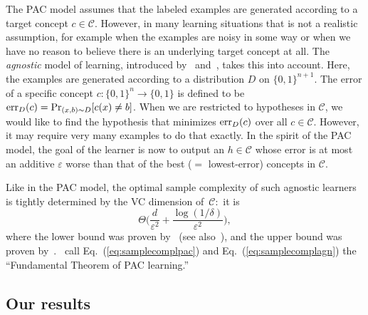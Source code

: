 \documentclass[twoside,11pt]{article}
\newcommand{\eps}{\varepsilon}
\newcommand{\err}{\mbox{\rm err}}
\def\01{\{0,1\}}
\newcommand{\C}{\ensuremath{\mathscr{C}}}
\begin{document}
The PAC model assumes that the labeled examples are generated according to a target concept $c\in\C$.
However, in many learning situations that is not a realistic assumption, for example when the examples are noisy in some way or when we have no reason to believe there is an underlying target concept at all. The \emph{agnostic} model of learning, introduced by~\cite{haussler:agnosticlearning} and~\cite{kearns:agnosticlearning}, takes this into account.
Here, the examples are generated according to a distribution $D$ on $\01^{n+1}$. The error of a specific concept $c:\01^n\to\01$ is defined to be
$\err_D(c)=\Pr_{(x,b)\sim D}[c(x)\neq b]$.
When we are restricted to hypotheses in $\C$, we would like to find the hypothesis that minimizes $\err_D(c)$ over all $c\in\C$. However, it may require very many examples to do that exactly. In the spirit of the PAC model, the goal of the learner is now to output an $h\in\C$ whose error is at most an additive $\eps$ worse than that of the best ($=$ lowest-error) concepts in $\C$.  

Like in the PAC model, the optimal sample complexity of such agnostic learners is tightly determined by the VC dimension of~$\C$:~it is
\begin{equation}\label{eq:samplecomplagn}
\Theta\Big(\frac{d}{\eps^2} + \frac{\log(1/\delta)}{\eps^2}\Big),
\end{equation}
where the lower bound was proven by~\cite{vapnik:agnosticlowerbound} (see also~\cite{simon:agnosticlowerbound}), and the upper bound was proven by~\cite{talagrand:agnosticupperbound}.~\cite{shwartz&david:learningbook} 
call Eq.~(\ref{eq:samplecomplpac}) and Eq.~(\ref{eq:samplecomplagn})
the ``Fundamental Theorem of PAC learning.''



\subsection{Our results}
\end{document}
